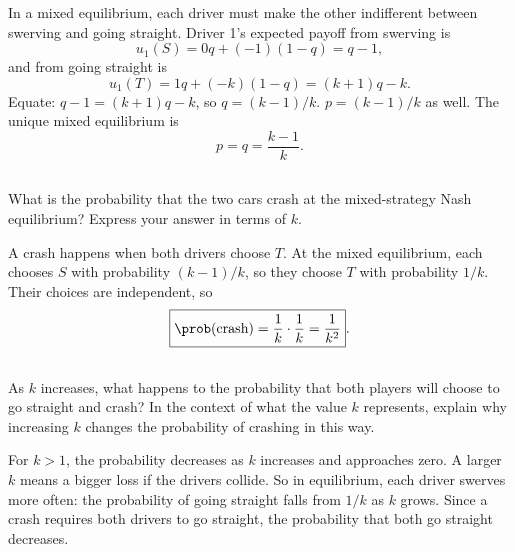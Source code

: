 \documentclass[newpages]{assignment}
\begin{document}
\begin{solution}
    In a mixed equilibrium, each driver must make the other indifferent
    between swerving and going straight. Driver 1's expected payoff from swerving is
    \[
        u_1(S)=0q+(-1)(1-q)=q-1,
    \]
    and from going straight is
    \[
        u_1(T)=1q+(-k)(1-q)=(k+1)q-k.
    \]
    Equate: \(q-1=(k+1)q-k\), so \(q=(k-1)/k\).
    \(p=(k-1)/k\) as well. The unique mixed equilibrium is
    \[
        \boxed{p=q=\frac{k-1}{k}}.
    \]
\end{solution}

\subsection{}

\begin{problem}
    What is the probability that the two cars crash at the mixed-strategy Nash
    equilibrium? Express your answer in terms of \(k\).
\end{problem}

\begin{solution}
    A crash happens when both drivers choose \(T\). At the mixed
    equilibrium, each chooses \(S\) with probability \((k-1)/k\), so they
    choose \(T\) with probability \(1/k\). Their choices are independent,
    so
    \[
        \boxed{\prob(\text{crash})=\frac{1}{k}\cdot\frac{1}{k}
            =\frac{1}{k^2}}.
    \]
\end{solution}

\subsection{}

\begin{problem}
    As \(k\) increases, what happens to the probability that both players will
    choose to go straight and crash? In the context of what the value \(k\)
    represents, explain why increasing \(k\) changes the probability of
    crashing in this way.
\end{problem}

\begin{solution}
    For \(k>1\), the probability
    decreases as \(k\) increases and approaches zero. A larger \(k\) means a
    bigger loss if the drivers collide. So in equilibrium, each driver
    swerves more often: the probability of going straight falls
    from \(1/k\) as \(k\) grows. Since a crash requires both drivers to go
    straight, the probability that both go straight decreases.
\end{solution}
\end{document}
